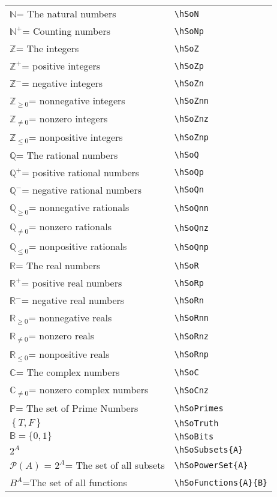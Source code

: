\documentclass[a4paper,10pt,landscape]{article}
\theoremstyle{definition}
\theoremstyle{remark}
\newcommand{\hSoN}  {\ensuremath{\mathbb{N}}}      %
\newcommand{\hSoNp} {\ensuremath{\mathbb{N}^{+}}} %
\newcommand{\hSoZ}  {\ensuremath{\mathbb{Z}}}      %
\newcommand{\hSoZp} {\ensuremath{\mathbb{Z}^{+}}} %
\newcommand{\hSoZn} {\ensuremath{\mathbb{Z}^{-}}} %
\newcommand{\hSoZnn}{\ensuremath{\mathbb{Z}_{\ge 0}}} %
\newcommand{\hSoZnz}{\ensuremath{\mathbb{Z}_{\neq 0}}} %
\newcommand{\hSoZnp}{\ensuremath{\mathbb{Z}_{\le 0}}} %
\newcommand{\hSoQ}  {\ensuremath{\mathbb{Q}}}      %
\newcommand{\hSoQp} {\ensuremath{\mathbb{Q}^{+}}} %
\newcommand{\hSoQn} {\ensuremath{\mathbb{Q}^{-}}} %
\newcommand{\hSoQnn}{\ensuremath{\mathbb{Q}_{\ge 0}}} %
\newcommand{\hSoQnz}{\ensuremath{\mathbb{Q}_{\neq 0}}} %
\newcommand{\hSoQnp}{\ensuremath{\mathbb{Q}_{\le 0}}} %
\newcommand{\hSoR}  {\ensuremath{\mathbb{R}}}      %
\newcommand{\hSoRp} {\ensuremath{\mathbb{R}^{+}}} %
\newcommand{\hSoRn} {\ensuremath{\mathbb{R}^{-}}} %
\newcommand{\hSoRnn}{\ensuremath{\mathbb{R}_{\ge 0}}} %
\newcommand{\hSoRnz}{\ensuremath{\mathbb{R}_{\neq 0}}} %
\newcommand{\hSoRnp}{\ensuremath{\mathbb{R}_{\le 0}}} %
\newcommand{\hSoC}  {\ensuremath{\mathbb{C}}}      %
\newcommand{\hSoCnz}{\ensuremath{\mathbb{C}_{\neq 0}}} %
\newcommand{\hSoPrimes}{\ensuremath{\mathbb{P}}} %
\newcommand{\hSoTruth}{\ensuremath{\left \{ T, F \right \}}} %
\newcommand{\hSoBits}{\ensuremath{\mathbb{B}}} %
\newcommand{\hSoFunctions}[2]{\ensuremath{#2^{#1}}} %
\newcommand{\hSoSubsets}[1]{\ensuremath{2^{#1}}} %
\newcommand{\hSoPowerSet}[1]{\ensuremath{\mathcal{P}(#1)}} %
\begin{document}
\begin{multicols}{3}
\begin{tabular}{@{}ll@{}}
	\hSoN = The natural numbers	&\verb!\hSoN!\\
	\hSoNp = Counting numbers	&\verb!\hSoNp!\\
	\hSoZ = The integers	&\verb!\hSoZ!\\
	\hSoZp = positive integers	&\verb!\hSoZp!\\
	\hSoZn = negative integers	&\verb!\hSoZn! \\
	\hSoZnn = nonnegative integers	&\verb!\hSoZnn!\\
	\hSoZnz = nonzero integers	&\verb!\hSoZnz!\\
	\hSoZnp = nonpositive integers	&\verb!\hSoZnp!\\
	\hSoQ = The rational numbers	&\verb!\hSoQ!\\
	\hSoQp = positive rational numbers	&\verb!\hSoQp!\\
	\hSoQn = negative rational numbers	&\verb!\hSoQn!\\
	\hSoQnn = nonnegative rationals	&\verb!\hSoQnn!\\
	\hSoQnz = nonzero rationals	&\verb!\hSoQnz!\\
	\hSoQnp = nonpositive rationals	&\verb!\hSoQnp!\\
	\hSoR = The real numbers	&\verb!\hSoR!\\
	\hSoRp = positive real numbers	&\verb!\hSoRp!\\
	\hSoRn = negative real numbers	&\verb!\hSoRn!\\
	\hSoRnn = nonnegative reals	&\verb!\hSoRnn!\\
	\hSoRnz = nonzero reals	&\verb!\hSoRnz!\\
	\hSoRnp = nonpositive reals	&\verb!\hSoRnp!\\
	\hSoC = The complex numbers	&\verb!\hSoC!\\
	\hSoCnz = nonzero complex numbers	&\verb!\hSoCnz!\\
	\hSoPrimes = The set of Prime Numbers	&\verb!\hSoPrimes!\\
	\hSoTruth	&\verb!\hSoTruth! \\
	$\hSoBits = \{ 0, 1 \}$	&\verb!\hSoBits!\\
	$\hSoSubsets{A}$	&\verb!\hSoSubsets{A}!\\
	$\hSoPowerSet{A}$ = $\hSoSubsets{A}$= The set of all subsets	&\verb!\hSoPowerSet{A}! \\
	$\hSoFunctions{A}{B}$=The set of all functions	&\verb!\hSoFunctions{A}{B}!\\
\end{tabular}





\end{multicols}
\end{document}
